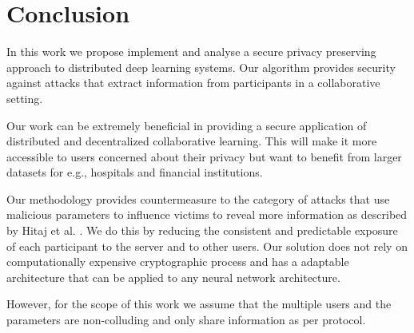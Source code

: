 \documentclass[conference]{IEEEtran}
\begin{document}
\section{Conclusion}
In this work we propose implement and analyse a secure privacy preserving approach to distributed deep learning systems.  Our algorithm provides security against attacks that extract information from participants in a collaborative setting. 

Our work can be extremely beneficial in providing a secure application of distributed and decentralized collaborative learning. This will make it more accessible to users concerned about their privacy but want to benefit from larger datasets for e.g., hospitals and financial institutions.

Our methodology provides countermeasure to the category of attacks that use malicious parameters to influence victims to reveal more information as described  by Hitaj  et al. \cite{hitaj2017deep} . We do this by reducing the consistent and predictable exposure of each participant to the server and to other users.
Our solution does not rely on computationally expensive cryptographic process and has a adaptable architecture that can be applied to any neural network architecture.

However, for the scope of this work we assume that the multiple users and the parameters are non-colluding and only share information as per protocol. 






\end{document}
